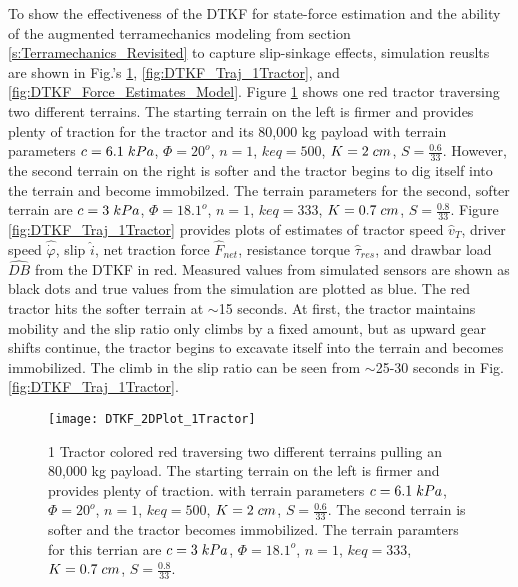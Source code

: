 To show the effectiveness of the DTKF for state-force estimation and the ability of the augmented terramechanics modeling from section \ref{s:Terramechanics_Revisited} to capture slip-sinkage effects, simulation reuslts are shown in Fig.'s \ref{fig:DTKF_2DPlot_1Tractor}, \ref{fig:DTKF_Traj_1Tractor}, and  \ref{fig:DTKF_Force_Estimates_Model}. Figure \ref{fig:DTKF_2DPlot_1Tractor} shows one red tractor traversing two different terrains. The starting terrain on the left is firmer and provides plenty of traction for the tractor and its 80,000 kg payload with terrain parameters $c = 6.1\hspace{1mm}kPa$, $\Phi = 20^o$, $n = 1$, $keq = 500$, $K = 2\hspace{1mm}cm$, $S = \frac{0.6}{33}$. However, the second terrain on the right is softer and the tractor begins to dig itself into the terrain and become immobilzed. The terrain parameters for the second, softer terrain are $c = 3\hspace{1mm}kPa$, $\Phi = 18.1^o$, $n = 1$, $keq = 333$, $K = 0.7\hspace{1mm}cm$, $S = \frac{0.8}{33}$. Figure \ref{fig:DTKF_Traj_1Tractor} provides plots of estimates of tractor speed $\hat{v}_T$, driver speed $\hat{\dot\varphi}$, slip $\hat{i}$, net traction force $\hat{F}_{net}$, resistance torque $\hat{\tau}_{res}$, and drawbar load $\hat{DB}$ from the DTKF in red. Measured values from simulated sensors are shown as black dots and true values from the simulation are plotted as blue. The red tractor hits the softer terrain at $\sim$15 seconds. At first, the tractor maintains mobility and the slip ratio only climbs by a fixed amount, but as upward gear shifts continue, the tractor begins to excavate itself into the terrain and becomes immobilized. The climb in the slip ratio can be seen from $\sim$25-30 seconds in Fig. \ref{fig:DTKF_Traj_1Tractor}.  
\begin{figure}[b]
    \centering
    \texttt{[image: DTKF\_2DPlot\_1Tractor]}
    \caption{1 Tractor colored red traversing two different terrains pulling an 80,000 kg payload. The starting terrain on the left is firmer and provides plenty of traction. with terrain parameters $c = 6.1\hspace{1mm}kPa$, $\Phi = 20^o$, $n = 1$, $keq = 500$, $K = 2\hspace{1mm}cm$, $S = \frac{0.6}{33}$. The second terrain is softer and the tractor becomes immobilized. The terrain paramters for this terrian are $c = 3\hspace{1mm}kPa$, $\Phi = 18.1^o$, $n = 1$, $keq = 333$, $K = 0.7\hspace{1mm}cm$, $S = \frac{0.8}{33}$.}
    \label{fig:DTKF_2DPlot_1Tractor}
\end{figure}
